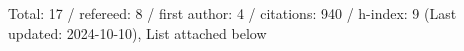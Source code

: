 Total: 17 / refereed: 8 / first author: 4 / citations: 940 / h-index: 9 (Last updated: 2024-10-10), List attached below